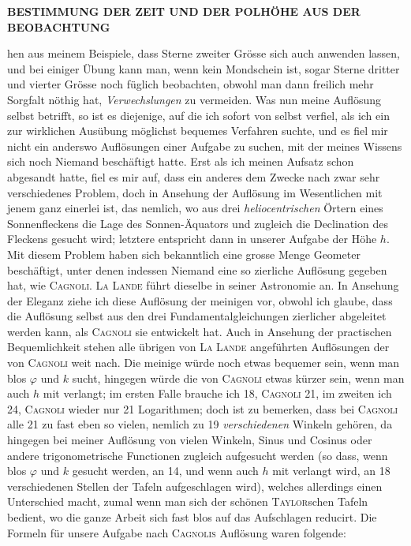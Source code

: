 \par\clearpage
\thispagestyle{empty}
\noindent{}%
%
\parbox[t]{\dimexpr\linewidth-20mm\relax}{\centering\fontsize{7}{9}\selectfont\bfseries BESTIMMUNG DER ZEIT UND DER POLHÖHE AUS DER BEOBACHTUNG\par}%
\makebox[10mm][r]{}\par\nobreak\medskip
\noindent hen aus meinem Beispiele, dass Sterne zweiter Grösse sich auch anwenden lassen, und bei einiger Übung kann man, wenn kein Mondschein ist, sogar Sterne dritter und vierter Grösse noch füglich beobachten, obwohl man dann freilich mehr Sorgfalt nöthig hat, \emph{Verwechslungen} zu vermeiden. Was nun meine Auflösung selbst betrifft, so ist es diejenige, auf die ich sofort von selbst verfiel, als ich ein zur wirklichen Ausübung möglichst bequemes Verfahren suchte, und es fiel mir nicht ein anderswo Auflösungen einer Aufgabe zu suchen, mit der meines Wissens sich noch Niemand beschäftigt hatte. Erst als ich meinen Aufsatz schon abgesandt hatte, fiel es mir auf, dass ein anderes dem Zwecke nach zwar sehr verschiedenes Problem, doch in Ansehung der Auflösung im Wesentlichen mit jenem ganz einerlei ist, das nemlich, wo aus drei \emph{heliocentrischen} Örtern eines Sonnenfleckens die Lage des Sonnen-Äquators und zugleich die Declination des Fleckens gesucht wird; letztere entspricht dann in unserer Aufgabe der Höhe $h$. Mit diesem Problem haben sich bekanntlich eine grosse Menge Geometer beschäftigt, unter denen indessen Niemand eine so zierliche Auflösung gegeben hat, wie \textsc{Cagnoli}. \textsc{La Lande} führt dieselbe in seiner Astronomie an. In Ansehung der Eleganz ziehe ich diese Auflösung der meinigen vor, obwohl ich glaube, dass die Auflösung selbst aus den drei Fundamentalgleichungen zierlicher abgeleitet werden kann, als \textsc{Cagnoli} sie entwickelt hat. Auch in Ansehung der practischen Bequemlichkeit stehen alle übrigen von \textsc{La Lande} angeführten Auflösungen der von \textsc{Cagnoli} weit nach. Die meinige würde noch etwas bequemer sein, wenn man blos $\varphi$ und $k$ sucht, hingegen würde die von \textsc{Cagnoli} etwas kürzer sein, wenn man auch $h$ mit verlangt; im ersten Falle brauche ich 18, \textsc{Cagnoli} 21, im zweiten ich 24, \textsc{Cagnoli} wieder nur 21 Logarithmen; doch ist zu bemerken, dass bei \textsc{Cagnoli} alle 21 zu fast eben so vielen, nemlich zu 19 \emph{verschiedenen} Winkeln gehören, da hingegen bei meiner Auflösung von vielen Winkeln, Sinus und Cosinus oder andere trigonometrische Functionen zugleich aufgesucht werden (so dass, wenn blos $\varphi$ und $k$ gesucht werden, an 14, und wenn auch $h$ mit verlangt wird, an 18 verschiedenen Stellen der Tafeln aufgeschlagen wird), welches allerdings einen Unterschied macht, zumal wenn man sich der schönen \textsc{Taylor}schen Tafeln bedient, wo die ganze Arbeit sich fast blos auf das Aufschlagen reducirt. Die Formeln für unsere Aufgabe nach \textsc{Cagnolis} Auflösung waren folgende:

